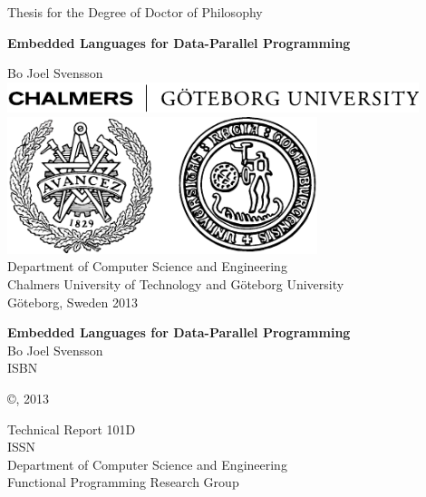 \documentclass[a4paper]{book}
\newcommand{\thesistitle}{Embedded Languages for Data-Parallel Programming}
\newcommand{\dept}{Department of Computer Science and Engineering}
\newcommand{\uni}{Chalmers University of Technology and G\"oteborg University}
\newcommand{\group}{Functional Programming Research Group}
\begin{document}
\begin{titlepage}
\begin{centering}
{\sc Thesis for the Degree of Doctor of Philosophy}
\vspace{30ex}

{\LARGE\bf\thesistitle}

\vspace{7ex}

\large Bo Joel Svensson
\vfill
\includegraphics[width=120mm]{./img/ChalmGUtextsvEng}\\[5mm]
\includegraphics[height=4cm]{./img/ChalmGUmarke}\\

\vspace{1cm}
\normalsize
{\sc \dept}\\
{\sc \uni}\\
G\"oteborg, Sweden 2013

\end{centering}
\end{titlepage}


\quad \vfill

{\noindent\large\bf\thesistitle} \\
\noindent Bo Joel Svensson \\
\noindent ISBN \\

\vspace{1cm}

\noindent\copyright {}, 2013 \\ 
\vspace{1cm} 

\noindent Technical Report 101D\\
\noindent ISSN                 \\
\noindent \dept \\
\noindent \group\\
\end{document}
